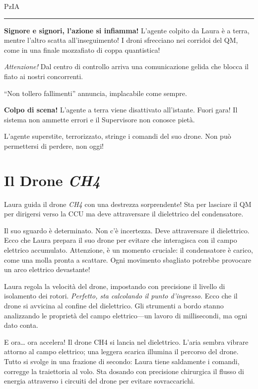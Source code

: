 \vspace{1em}
\begin{center}PzIA\end{center}
\hrule
\vspace{1em}

\textbf{Signore e signori, l'azione si infiamma!} L'agente colpito da Laura è a terra, mentre l'altro scatta all'inseguimento!
I droni sfrecciano nei corridoi del QM, come in una finale mozzafiato di coppa quantistica!

\emph{Attenzione!} Dal centro di controllo arriva una comunicazione gelida che blocca il fiato ai nostri concorrenti.
\begin{dialogue}
 ``Non tollero fallimenti'' annuncia, implacabile come sempre.
\end{dialogue}
\textbf{Colpo di scena!} L'agente a terra viene disattivato all'istante. Fuori gara! Il sistema non ammette errori e il Supervisore non conosce pietà.

L'agente superstite, terrorizzato, stringe i comandi del suo drone. Non può permettersi di perdere, non oggi!



\section{Il Drone \textit{CH4}}

Laura guida il drone \textit{CH4} con una destrezza sorprendente!
Sta per lasciare il QM per dirigersi verso la CCU ma deve attraversare il dielettrico del condensatore.

Il suo sguardo è determinato. Non c'è incertezza. Deve attraversare il dielettrico. Ecco che Laura prepara il suo drone per evitare che interagisca con il campo elettrico accumulato. Attenzione, è un momento cruciale: il condensatore è carico, come una molla pronta a scattare. Ogni movimento sbagliato potrebbe provocare un arco elettrico devastante!

Laura regola la velocità del drone, impostando con precisione il livello di isolamento dei rotori. \textit{Perfetto, sta calcolando il punto d'ingresso.} Ecco che il drone si avvicina al confine del dielettrico. Gli strumenti a bordo stanno analizzando le proprietà del campo elettrico—un lavoro di millisecondi, ma ogni dato conta.

E ora… ora accelera! Il drone CH4 si lancia nel dielettrico. L’aria sembra vibrare attorno al campo elettrico; una leggera scarica illumina il percorso del drone. Tutto si svolge in una frazione di secondo: Laura tiene saldamente i comandi, corregge la traiettoria al volo. Sta dosando con precisione chirurgica il flusso di energia attraverso i circuiti del drone per evitare sovraccarichi.


